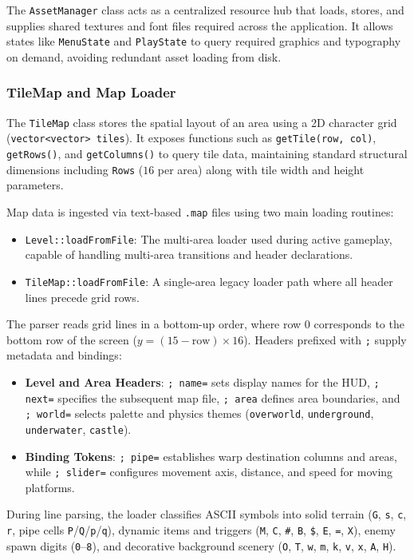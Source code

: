 \documentclass[12pt, a4paper]{article}
\begin{document}
The \texttt{AssetManager} class acts as a centralized resource hub that loads, stores, and supplies shared textures and font files required across the application. It allows states like \texttt{MenuState} and \texttt{PlayState} to query required graphics and typography on demand, avoiding redundant asset loading from disk.
\subsubsection{TileMap and Map Loader}

The \texttt{TileMap} class stores the spatial layout of an area using a 2D character grid (\texttt{vector<vector> tiles}). It exposes functions such as \texttt{getTile(row, col)}, \texttt{getRows()}, and \texttt{getColumns()} to query tile data, maintaining standard structural dimensions including \texttt{Rows} ($16$ per area) along with tile width and height parameters.

Map data is ingested via text-based \texttt{.map} files using two main loading routines:
\begin{itemize}
\item \texttt{Level::loadFromFile}: The multi-area loader used during active gameplay, capable of handling multi-area transitions and header declarations.
\item \texttt{TileMap::loadFromFile}: A single-area legacy loader path where all header lines precede grid rows.
\end{itemize}

The parser reads grid lines in a bottom-up order, where row 0 corresponds to the bottom row of the screen ($y = (15 - \text{row}) \times 16$). Headers prefixed with \texttt{;} supply metadata and bindings:
\begin{itemize}
\item \textbf{Level and Area Headers}: \texttt{; name=} sets display names for the HUD, \texttt{; next=} specifies the subsequent map file, \texttt{; area} defines area boundaries, and \texttt{; world=} selects palette and physics themes (\texttt{overworld}, \texttt{underground}, \texttt{underwater}, \texttt{castle}).
\item \textbf{Binding Tokens}: \texttt{; pipe=} establishes warp destination columns and areas, while \texttt{; slider=} configures movement axis, distance, and speed for moving platforms.
\end{itemize}

During line parsing, the loader classifies ASCII symbols into solid terrain (\texttt{G}, \texttt{s}, \texttt{c}, \texttt{r}, pipe cells \texttt{P}/\texttt{Q}/\texttt{p}/\texttt{q}), dynamic items and triggers (\texttt{M}, \texttt{C}, \texttt{\#}, \texttt{B}, \texttt{\$}, \texttt{E}, \texttt{=}, \texttt{X}), enemy spawn digits (\texttt{0}--\texttt{8}), and decorative background scenery (\texttt{O}, \texttt{T}, \texttt{w}, \texttt{m}, \texttt{k}, \texttt{v}, \texttt{x}, \texttt{A}, \texttt{H}).
\end{document}
